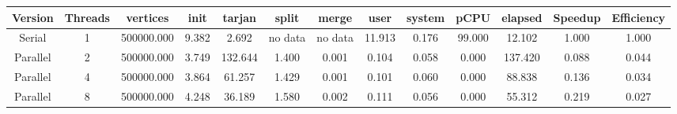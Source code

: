 \begin{tabular}{|c|c|c|c|c|c|c|c|c|c|c|c|c|}
\toprule
 Version &  Threads &   vertices &  init &  tarjan &   split &   merge &   user &  system &   pCPU &  elapsed &  Speedup &  Efficiency \\
\midrule
  Serial &        1 & 500000.000 & 9.382 &   2.692 & no data & no data & 11.913 &   0.176 & 99.000 &   12.102 &    1.000 &       1.000 \\
Parallel &        2 & 500000.000 & 3.749 & 132.644 &   1.400 &   0.001 &  0.104 &   0.058 &  0.000 &  137.420 &    0.088 &       0.044 \\
Parallel &        4 & 500000.000 & 3.864 &  61.257 &   1.429 &   0.001 &  0.101 &   0.060 &  0.000 &   88.838 &    0.136 &       0.034 \\
Parallel &        8 & 500000.000 & 4.248 &  36.189 &   1.580 &   0.002 &  0.111 &   0.056 &  0.000 &   55.312 &    0.219 &       0.027 \\
\bottomrule
\end{tabular}
